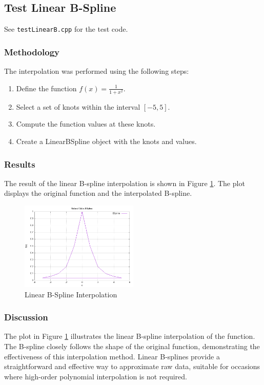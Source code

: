 \documentclass{article}
\begin{document}
\subsection{Test Linear B-Spline}
See \texttt{testLinearB.cpp} for the test code.
\subsubsection{Methodology}
The interpolation was performed using the following steps:
\begin{enumerate}
    \item Define the function \( f(x) = \frac{1}{1 + x^2} \).
    \item Select a set of knots within the interval \([-5, 5]\).
    \item Compute the function values at these knots.
    \item Create a LinearBSpline object with the knots and values.
\end{enumerate}

\subsubsection{Results}
The result of the linear B-spline interpolation is shown in Figure \ref{fig:bspline}. The plot displays the original function and the interpolated B-spline.

\begin{figure}[h]
    \centering
    \includegraphics[width=0.5\textwidth]{../figure/LBspline_plot.png}
    \caption{Linear B-Spline Interpolation}
    \label{fig:bspline}
\end{figure}

\subsubsection{Discussion}
The plot in Figure \ref{fig:bspline} illustrates the linear B-spline interpolation of the function. The B-spline closely follows the shape of the original function, demonstrating the effectiveness of this interpolation method. Linear B-splines provide a straightforward and effective way to approximate raw data, suitable for occasions where high-order polynomial interpolation is not required.
\end{document}
